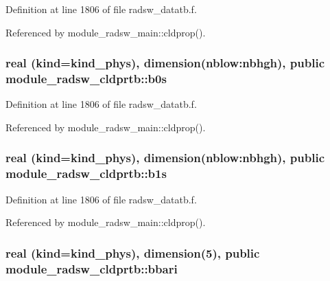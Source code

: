Definition at line 1806 of file radsw\+\_\+datatb.\+f.



Referenced by module\+\_\+radsw\+\_\+main\+::cldprop().

\subsubsection[{\texorpdfstring{b0s}{b0s}}]{\setlength{\rightskip}{0pt plus 5cm}real (kind=kind\+\_\+phys), dimension(nblow\+:nbhgh), public module\+\_\+radsw\+\_\+cldprtb\+::b0s}\hypertarget{namespacemodule__radsw__cldprtb_a391fbdda62f6fba95e105c2041e16880}{}\label{namespacemodule__radsw__cldprtb_a391fbdda62f6fba95e105c2041e16880}


Definition at line 1806 of file radsw\+\_\+datatb.\+f.



Referenced by module\+\_\+radsw\+\_\+main\+::cldprop().

\subsubsection[{\texorpdfstring{b1s}{b1s}}]{\setlength{\rightskip}{0pt plus 5cm}real (kind=kind\+\_\+phys), dimension(nblow\+:nbhgh), public module\+\_\+radsw\+\_\+cldprtb\+::b1s}\hypertarget{namespacemodule__radsw__cldprtb_a2d2296e76fb85b66bd4583bcb9fa271b}{}\label{namespacemodule__radsw__cldprtb_a2d2296e76fb85b66bd4583bcb9fa271b}


Definition at line 1806 of file radsw\+\_\+datatb.\+f.



Referenced by module\+\_\+radsw\+\_\+main\+::cldprop().

\subsubsection[{\texorpdfstring{bbari}{bbari}}]{\setlength{\rightskip}{0pt plus 5cm}real (kind=kind\+\_\+phys), dimension(5), public module\+\_\+radsw\+\_\+cldprtb\+::bbari}\hypertarget{namespacemodule__radsw__cldprtb_ad5342321ccd4759cb70f7a673620ee19}{}\label{namespacemodule__radsw__cldprtb_ad5342321ccd4759cb70f7a673620ee19}


